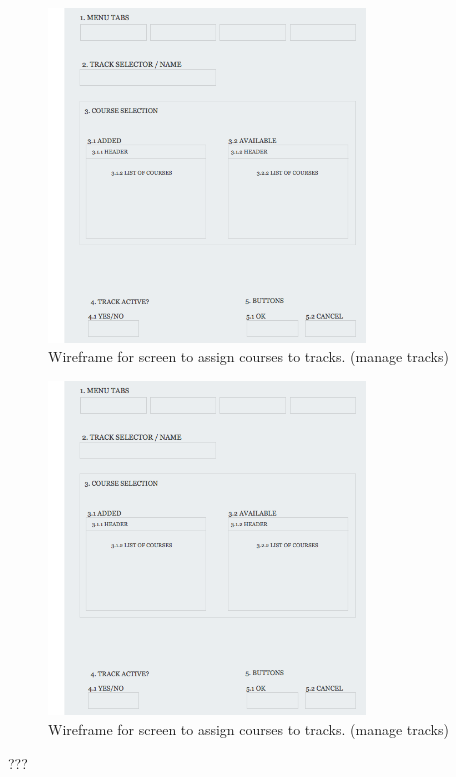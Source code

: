 \clearpage

\begin{figure}
\begin{center}
\leavevmode
\includegraphics[width=0.75\textwidth]{images/wireframe_tracks}
\end{center}
\caption{Wireframe for screen to assign courses to tracks. (manage tracks)}
\label{fig:app2_mock1_w}
\end{figure}

\begin{figure}
\begin{center}
\leavevmode
\includegraphics[width=0.75\textwidth]{images/wireframe_tracks}
\end{center}
\caption{Wireframe for screen to assign courses to tracks. (manage tracks)}
\label{fig:app2_mock1_w}
\end{figure}
???

